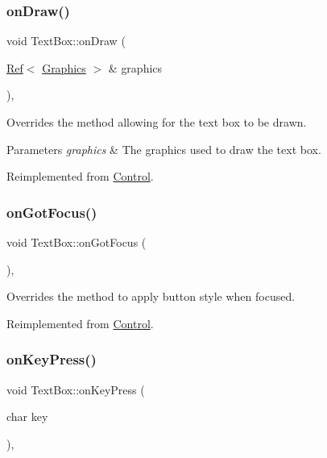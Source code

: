 \subsubsection{\texorpdfstring{onDraw()}{onDraw()}}
{\footnotesize\ttfamily void Text\+Box\+::on\+Draw (\begin{DoxyParamCaption}\item[{\mbox{\hyperlink{class_ref}{Ref}}$<$ \mbox{\hyperlink{class_graphics}{Graphics}} $>$ \&}]{graphics }\end{DoxyParamCaption})\hspace{0.3cm}{\ttfamily [override]}, {\ttfamily [virtual]}}



Overrides the method allowing for the text box to be drawn. 


\begin{DoxyParams}{Parameters}
{\em graphics} & The graphics used to draw the text box.\\
\hline
\end{DoxyParams}


Reimplemented from \mbox{\hyperlink{class_control_a5f89270d0d05a6bac9128db0b1d290d2}{Control}}.

\mbox{\label{class_text_box_acf8cced7a7c1ebb3b8bd72ee0901eef8}} 
\subsubsection{\texorpdfstring{onGotFocus()}{onGotFocus()}}
{\footnotesize\ttfamily void Text\+Box\+::on\+Got\+Focus (\begin{DoxyParamCaption}{ }\end{DoxyParamCaption})\hspace{0.3cm}{\ttfamily [override]}, {\ttfamily [virtual]}}



Overrides the method to apply button style when focused. 



Reimplemented from \mbox{\hyperlink{class_control_ac21652bd9bd20bd53eeab52432556a0c}{Control}}.

\mbox{\label{class_text_box_ae879afb224d1ad754996d2386743c2da}} 
\subsubsection{\texorpdfstring{onKeyPress()}{onKeyPress()}}
{\footnotesize\ttfamily void Text\+Box\+::on\+Key\+Press (\begin{DoxyParamCaption}\item[{char}]{key }\end{DoxyParamCaption})\hspace{0.3cm}{\ttfamily [override]}, {\ttfamily [virtual]}}



